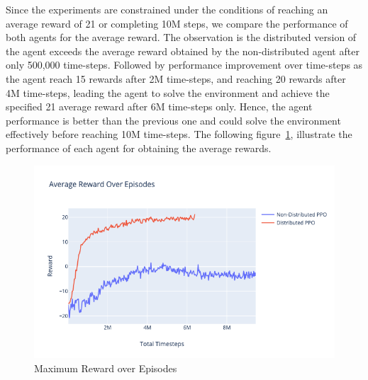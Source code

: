 Since the experiments are constrained under the conditions of reaching an average reward of 21 or completing 10M steps, we compare the performance of both agents for the average reward. The observation is the distributed version of the agent exceeds the average reward obtained by the non-distributed agent after only 500,000 time-steps. Followed by performance improvement over time-steps as the agent reach 15 rewards after 2M time-steps, and reaching 20 rewards after 4M time-steps, leading the agent to solve the environment and achieve the specified 21 average reward after 6M time-steps only. Hence, the agent performance is better than the previous one and could solve the environment effectively before reaching 10M time-steps. The following figure~\ref{fig:2nd_exp_avg_eps_reward}, illustrate the performance of each agent for obtaining the average rewards.
\begin{figure}[!htb]
		\centering
		\includegraphics[width=\linewidth]{figures/exps/2nd_exp/avg_eps_reward.png}
		\caption{Maximum Reward over Episodes}
		\label{fig:2nd_exp_avg_eps_reward}
\end{figure}


